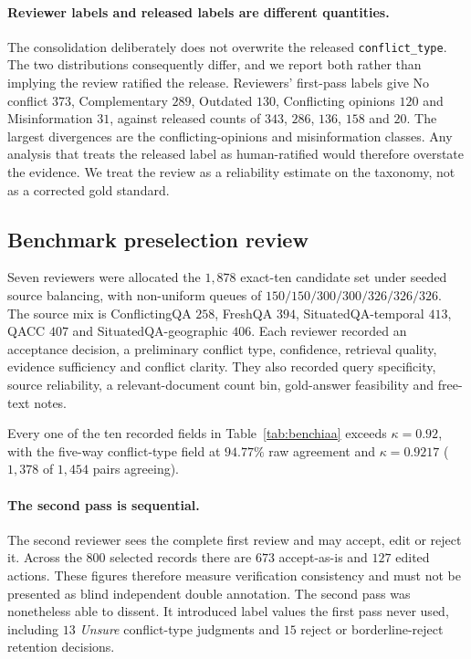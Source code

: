 \paragraph{Reviewer labels and released labels are different quantities.} The
consolidation deliberately does not overwrite the released \texttt{conflict\_type}.
The two distributions consequently differ, and we report both rather than
implying the review ratified the release. Reviewers' first-pass labels give
No conflict $373$, Complementary $289$, Outdated $130$, Conflicting opinions
$120$ and Misinformation $31$, against released counts of $343$, $286$, $136$,
$158$ and $20$. The largest divergences are the conflicting-opinions and
misinformation classes. Any analysis that treats the released label as
human-ratified would therefore overstate the evidence. We treat the review as a
reliability estimate on the taxonomy, not as a corrected gold standard.

\subsection{Benchmark preselection review}

Seven reviewers were allocated the $1{,}878$ exact-ten candidate set under seeded
source balancing, with non-uniform queues of $150/150/300/300/326/326/326$. The
source mix is ConflictingQA $258$, FreshQA $394$, SituatedQA-temporal $413$,
QACC $407$ and SituatedQA-geographic $406$. Each reviewer recorded an acceptance
decision, a preliminary conflict type, confidence, retrieval quality, evidence
sufficiency and conflict clarity. They also recorded query specificity, source reliability, a
relevant-document count bin, gold-answer feasibility and free-text notes.

Every one of the ten recorded fields in Table~\ref{tab:benchiaa} exceeds
$\kappa=0.92$, with the five-way conflict-type field at $94.77\%$ raw agreement
and $\kappa=0.9217$ ($1{,}378$ of $1{,}454$ pairs agreeing).

\paragraph{The second pass is sequential.} The second reviewer sees the complete
first review and may accept, edit or reject it. Across the 800 selected records
there are $673$ accept-as-is and $127$ edited actions. These figures therefore
measure verification consistency and must not be presented as blind independent
double annotation. The second pass was nonetheless able to dissent. It introduced
label values the first pass never used, including $13$ \textit{Unsure}
conflict-type judgments and $15$ reject or borderline-reject retention decisions.


